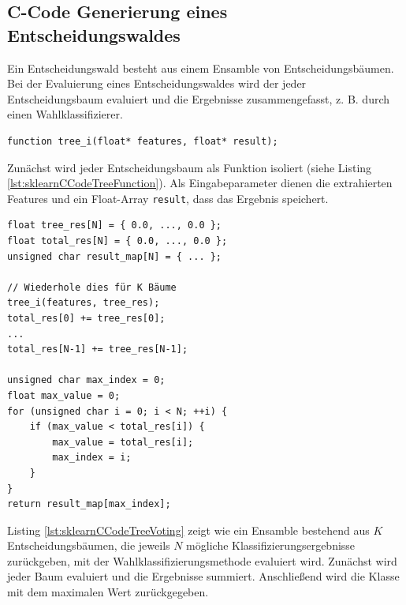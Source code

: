 \subsection{C-Code Generierung eines Entscheidungswaldes}
Ein Entscheidungswald besteht aus einem Ensamble von Entscheidungsbäumen. Bei der Evaluierung eines Entscheidungswaldes wird der jeder Entscheidungsbaum evaluiert und die Ergebnisse zusammengefasst, z. B.
durch einen Wahlklassifizierer.
\begin{lstlisting}[label=lst:sklearnCCodeTreeFunction,caption={C-Code Funktionskopf eines Baumes $i$.}]
function tree_i(float* features, float* result);
\end{lstlisting}
Zunächst wird jeder Entscheidungsbaum als Funktion isoliert (siehe Listing \ref{lst:sklearnCCodeTreeFunction}). Als Eingabeparameter dienen die extrahierten Features und ein Float-Array \texttt{result}, dass das
Ergebnis speichert.
\begin{lstlisting}[label=lst:sklearnCCodeTreeVoting,caption={C-Code des Wahlklassifizierers mit $N$ Klassen und $K$ Bäumen.}]
float tree_res[N] = { 0.0, ..., 0.0 };
float total_res[N] = { 0.0, ..., 0.0 };
unsigned char result_map[N] = { ... };

// Wiederhole dies für K Bäume
tree_i(features, tree_res);
total_res[0] += tree_res[0];
...
total_res[N-1] += tree_res[N-1];

unsigned char max_index = 0;
float max_value = 0;
for (unsigned char i = 0; i < N; ++i) {
    if (max_value < total_res[i]) {
        max_value = total_res[i];
        max_index = i;
    }
}
return result_map[max_index];
\end{lstlisting}
Listing \ref{lst:sklearnCCodeTreeVoting} zeigt wie ein Ensamble bestehend aus $K$ Entscheidungsbäumen, die jeweils $N$ mögliche Klassifizierungsergebnisse zurückgeben, mit der Wahlklassifizierungsmethode
evaluiert wird. Zunächst wird jeder Baum evaluiert und die Ergebnisse summiert. Anschließend wird die Klasse mit dem maximalen Wert zurückgegeben.